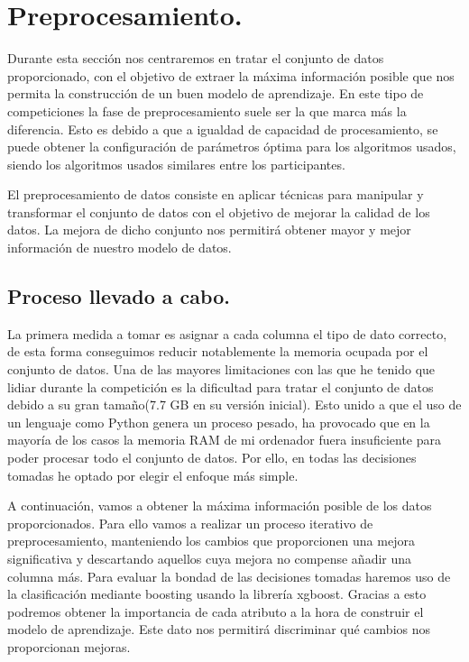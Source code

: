 \chapter{Preprocesamiento.}
Durante esta sección nos centraremos en tratar el conjunto de datos proporcionado, con el objetivo de extraer la máxima información posible que nos permita la construcción de un buen modelo de aprendizaje.
En este tipo de competiciones la fase de preprocesamiento suele ser la que marca más la diferencia. Esto es debido a que a igualdad de capacidad de procesamiento, se puede obtener la configuración de parámetros óptima para los algoritmos usados, siendo los algoritmos usados similares entre los participantes.
\bigskip

El preprocesamiento de datos consiste en aplicar técnicas para manipular y transformar el conjunto de datos con el objetivo de mejorar la calidad de los datos. La mejora de dicho conjunto nos permitirá obtener mayor y mejor información de nuestro modelo de datos. 

\section{Proceso llevado a cabo.}
La primera medida a tomar es asignar a cada columna el tipo de dato correcto, de esta forma conseguimos reducir notablemente la memoria ocupada por el conjunto de datos. 
Una de las mayores limitaciones con las que he tenido que lidiar durante la competición es la dificultad para tratar el conjunto de datos debido a su gran tamaño(7.7 GB en su versión inicial). Esto unido a que el uso de un lenguaje como Python genera un proceso pesado, ha provocado que en la mayoría de los casos la memoria RAM de mi ordenador fuera insuficiente para poder procesar todo el conjunto de datos. Por ello, en todas las decisiones tomadas he optado por elegir el enfoque más simple.
\medskip


A continuación, vamos a obtener la máxima información posible de los datos proporcionados. Para ello vamos a realizar un proceso iterativo de preprocesamiento, manteniendo los cambios que proporcionen una mejora significativa y descartando aquellos cuya mejora no compense añadir una columna más. Para evaluar la bondad de las decisiones tomadas haremos uso de la clasificación mediante boosting usando la librería xgboost. Gracias a esto podremos obtener la importancia de cada atributo a la hora de construir el modelo de aprendizaje. Este dato nos permitirá discriminar qué cambios nos proporcionan mejoras.
\bigskip

